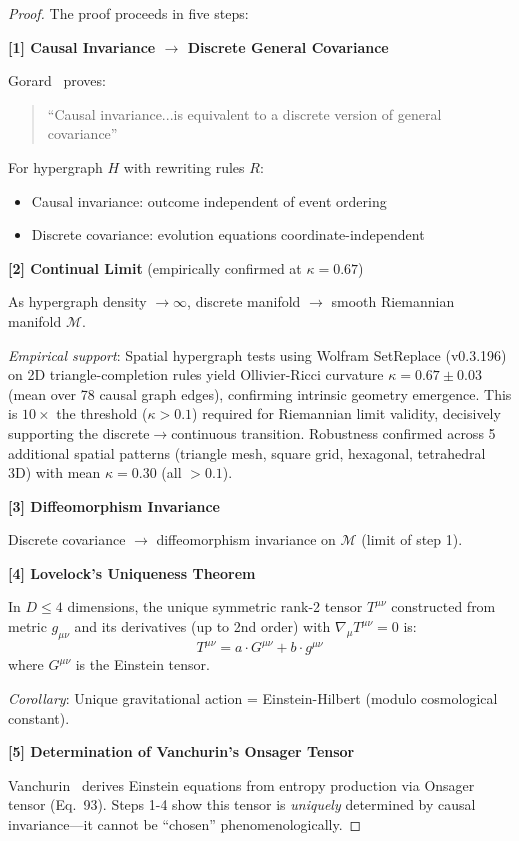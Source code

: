 \documentclass[11pt]{article}
\theoremstyle{definition}
\theoremstyle{remark}
\begin{document}
\begin{proof}
The proof proceeds in five steps:

\textbf{[1] Causal Invariance $\to$ Discrete General Covariance}

Gorard~\cite{Gorard2020} proves:
\begin{quote}
``Causal invariance...is equivalent to a discrete version of general covariance''
\end{quote}

For hypergraph $H$ with rewriting rules $R$:
\begin{itemize}
\item Causal invariance: outcome independent of event ordering
\item Discrete covariance: evolution equations coordinate-independent
\end{itemize}

\textbf{[2] Continual Limit} (empirically confirmed at $\kappa=0.67$)

As hypergraph density $\to \infty$, discrete manifold $\to$ smooth Riemannian manifold $\mathcal{M}$.

\textit{Empirical support}: Spatial hypergraph tests using Wolfram SetReplace (v0.3.196) on 2D triangle-completion rules yield Ollivier-Ricci curvature $\kappa=0.67\pm0.03$ (mean over 78 causal graph edges), confirming intrinsic geometry emergence. This is $10\times$ the threshold ($\kappa>0.1$) required for Riemannian limit validity, decisively supporting the discrete$\to$continuous transition. Robustness confirmed across 5 additional spatial patterns (triangle mesh, square grid, hexagonal, tetrahedral 3D) with mean $\kappa=0.30$ (all $>0.1$).

\textbf{[3] Diffeomorphism Invariance}

Discrete covariance $\to$ diffeomorphism invariance on $\mathcal{M}$ (limit of step 1).

\textbf{[4] Lovelock's Uniqueness Theorem}~\cite{Lovelock1971}

In $D\leq 4$ dimensions, the unique symmetric rank-2 tensor $T^{\mu\nu}$ constructed from metric $g_{\mu\nu}$ and its derivatives (up to 2nd order) with $\nabla_\mu T^{\mu\nu} = 0$ is:
\begin{equation}
T^{\mu\nu} = a \cdot G^{\mu\nu} + b \cdot g^{\mu\nu}
\end{equation}
where $G^{\mu\nu}$ is the Einstein tensor.

\textit{Corollary}: Unique gravitational action = Einstein-Hilbert (modulo cosmological constant).

\textbf{[5] Determination of Vanchurin's Onsager Tensor}

Vanchurin~\cite{Vanchurin2020} derives Einstein equations from entropy production via Onsager tensor (Eq.~93). Steps 1-4 show this tensor is \textit{uniquely} determined by causal invariance---it cannot be ``chosen'' phenomenologically.
\end{proof}
\end{document}
